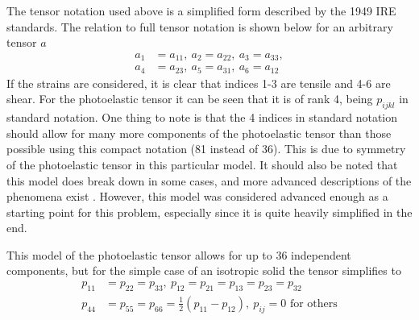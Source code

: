 \documentclass[11pt,twoside]{eitExjobb}
\begin{document}
	The tensor notation used above is a simplified form described by the 1949 IRE standards. The relation to full tensor notation is shown below for an arbitrary tensor $a$ \cite{Korpel1988}
	\begin{equation*}
	\begin{split}
		a_1 &= a_{11},\ a_2 = a_{22},\ a_3 = a_{33}, \\
		a_4 &= a_{23},\ a_5 = a_{31},\ a_6 = a_{12}
	\end{split}
	\end{equation*}
	If the strains are considered, it is clear that indices 1-3 are tensile and 4-6 are shear. For the photoelastic tensor it can be seen that it is of rank 4, being $p_{ijkl}$ in standard notation. One thing to note is that the 4 indices in standard notation should allow for many more components of the photoelastic tensor than those possible using this compact notation (81 instead of 36). This is due to symmetry of the photoelastic tensor in this particular model. \addref It should also be noted that this model does break down in some cases, and more advanced descriptions of the phenomena exist \cite{Nelson1971}. However, this model was considered advanced enough as a starting point for this problem, especially since it is quite heavily simplified in the end.
	
	This model of the photoelastic tensor allows for up to 36 independent components, but for the simple case of an isotropic solid the tensor simplifies to \cite{Korpel1988}
	\begin{equation*}
	\begin{split}
		p_{11} &= p_{22} = p_{33}, \ p_{12} = p_{21} = p_{13} = p_{23} = p_{32}\\
		p_{44} &= p_{55} = p_{66} = \frac{1}{2} (p_{11} - p_{12}), \ p_{ij} = 0 \text{ for others}
	\end{split}
	\end{equation*}
	
\end{document}
